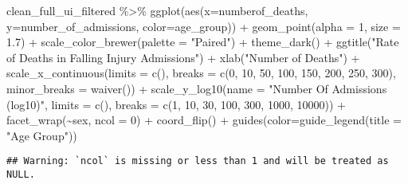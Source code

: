 \documentclass[
]{article}
\newenvironment{Shaded}{\begin{snugshade}}{\end{snugshade}}
\newcommand{\AttributeTok}[1]{\textcolor[rgb]{0.77,0.63,0.00}{#1}}
\newcommand{\DecValTok}[1]{\textcolor[rgb]{0.00,0.00,0.81}{#1}}
\newcommand{\FloatTok}[1]{\textcolor[rgb]{0.00,0.00,0.81}{#1}}
\newcommand{\FunctionTok}[1]{\textcolor[rgb]{0.00,0.00,0.00}{#1}}
\newcommand{\NormalTok}[1]{#1}
\newcommand{\SpecialCharTok}[1]{\textcolor[rgb]{0.00,0.00,0.00}{#1}}
\newcommand{\StringTok}[1]{\textcolor[rgb]{0.31,0.60,0.02}{#1}}
\begin{document}
\begin{Shaded}
\begin{Highlighting}[]
\NormalTok{clean\_full\_ui\_filtered }\SpecialCharTok{\%\textgreater{}\%} 
  \FunctionTok{ggplot}\NormalTok{(}\FunctionTok{aes}\NormalTok{(}\AttributeTok{x=}\NormalTok{numberof\_deaths, }\AttributeTok{y=}\NormalTok{number\_of\_admissions, }\AttributeTok{color=}\NormalTok{age\_group)) }\SpecialCharTok{+} 
  \FunctionTok{geom\_point}\NormalTok{(}\AttributeTok{alpha =} \DecValTok{1}\NormalTok{, }\AttributeTok{size =} \FloatTok{1.7}\NormalTok{) }\SpecialCharTok{+}
  \FunctionTok{scale\_color\_brewer}\NormalTok{(}\AttributeTok{palette =} \StringTok{"Paired"}\NormalTok{) }\SpecialCharTok{+}
  \FunctionTok{theme\_dark}\NormalTok{() }\SpecialCharTok{+}
  \FunctionTok{ggtitle}\NormalTok{(}\StringTok{"Rate of Deaths in Falling Injury Admissions"}\NormalTok{) }\SpecialCharTok{+}
  \FunctionTok{xlab}\NormalTok{(}\StringTok{"Number of Deaths"}\NormalTok{) }\SpecialCharTok{+}
  \FunctionTok{scale\_x\_continuous}\NormalTok{(}\AttributeTok{limits =} \FunctionTok{c}\NormalTok{(),}
          \AttributeTok{breaks =} \FunctionTok{c}\NormalTok{(}\DecValTok{0}\NormalTok{, }\DecValTok{10}\NormalTok{, }\DecValTok{50}\NormalTok{, }\DecValTok{100}\NormalTok{, }\DecValTok{150}\NormalTok{, }\DecValTok{200}\NormalTok{, }\DecValTok{250}\NormalTok{, }\DecValTok{300}\NormalTok{),}
          \AttributeTok{minor\_breaks =} \FunctionTok{waiver}\NormalTok{()) }\SpecialCharTok{+}
  \FunctionTok{scale\_y\_log10}\NormalTok{(}\AttributeTok{name =} \StringTok{"Number Of Admissions (log10)"}\NormalTok{, }
          \AttributeTok{limits =} \FunctionTok{c}\NormalTok{(),  }
          \AttributeTok{breaks =} \FunctionTok{c}\NormalTok{(}\DecValTok{1}\NormalTok{, }\DecValTok{10}\NormalTok{, }\DecValTok{30}\NormalTok{, }\DecValTok{100}\NormalTok{, }\DecValTok{300}\NormalTok{, }\DecValTok{1000}\NormalTok{, }\DecValTok{10000}\NormalTok{)) }\SpecialCharTok{+}
  \FunctionTok{facet\_wrap}\NormalTok{(}\SpecialCharTok{\textasciitilde{}}\NormalTok{sex, }\AttributeTok{ncol =} \DecValTok{0}\NormalTok{) }\SpecialCharTok{+}
  \FunctionTok{coord\_flip}\NormalTok{() }\SpecialCharTok{+}
  \FunctionTok{guides}\NormalTok{(}\AttributeTok{color=}\FunctionTok{guide\_legend}\NormalTok{(}\AttributeTok{title =} \StringTok{"Age Group"}\NormalTok{)) }
\end{Highlighting}
\end{Shaded}

\begin{verbatim}
## Warning: `ncol` is missing or less than 1 and will be treated as NULL.
\end{verbatim}
\end{document}
